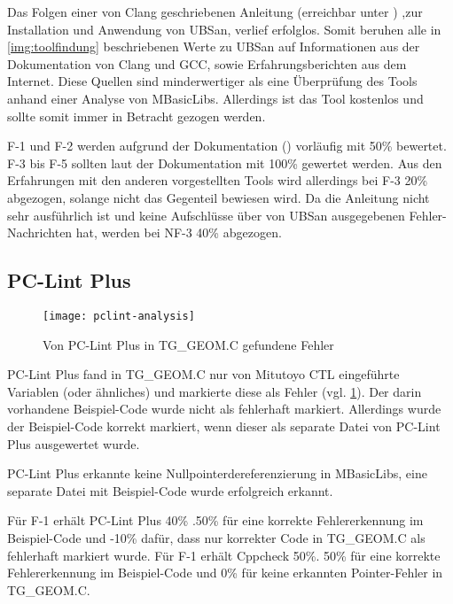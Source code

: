 Das Folgen einer von Clang geschriebenen Anleitung (erreichbar unter \cite{misc:ubsan}) ,zur Installation und Anwendung von UBSan, verlief erfolglos. Somit beruhen alle in \ref{img:toolfindung} 
beschriebenen Werte zu UBSan auf Informationen aus der Dokumentation von Clang und GCC, sowie Erfahrungsberichten aus dem Internet. Diese Quellen sind minderwertiger als eine 
Überprüfung des Tools anhand einer Analyse von MBasicLibs. Allerdings ist das Tool kostenlos und sollte somit immer in Betracht gezogen werden. 

F-1 und F-2 werden aufgrund der Dokumentation (\cite{misc:ubsan}) vorläufig mit 50\% bewertet. \newline
F-3 bis F-5 sollten laut der Dokumentation mit 100\% gewertet werden. Aus den Erfahrungen mit den anderen vorgestellten Tools wird allerdings bei F-3 20\% abgezogen, solange nicht das 
Gegenteil bewiesen wird. \newline
Da die Anleitung nicht sehr ausführlich ist und keine Aufschlüsse über von UBSan ausgegebenen Fehler-Nachrichten hat, werden bei NF-3 40\% abgezogen.

\subsection{PC-Lint Plus}

\begin{figure}[htpb]
  \centering
  \texttt{[image: pclint-analysis]}
  \caption{Von PC-Lint Plus in TG\_GEOM.C gefundene Fehler}
  \label{img:pclint-analysis}
\end{figure}

PC-Lint Plus fand in \glqq{}TG\_GEOM.C\grqq{} nur von Mitutoyo CTL eingeführte Variablen (oder ähnliches) und markierte diese als Fehler (vgl. \ref{img:pclint-analysis}). Der darin vorhandene Beispiel-Code 
wurde nicht als fehlerhaft markiert. Allerdings wurde der Beispiel-Code korrekt markiert, wenn dieser als separate Datei von PC-Lint Plus ausgewertet wurde.

PC-Lint Plus erkannte keine Nullpointerdereferenzierung in MBasicLibs, eine separate Datei mit Beispiel-Code wurde erfolgreich erkannt.

Für F-1 erhält PC-Lint Plus 40\% .50\% für eine korrekte Fehlererkennung im Beispiel-Code und -10\% dafür, dass nur korrekter Code in \glqq{}TG\_GEOM.C\grqq{} als fehlerhaft markiert 
wurde. \newline
Für F-1 erhält Cppcheck 50\%. 50\% für eine korrekte Fehlererkennung im Beispiel-Code und 0\% für keine erkannten Pointer-Fehler in \glqq{}TG\_GEOM.C\grqq{}.

